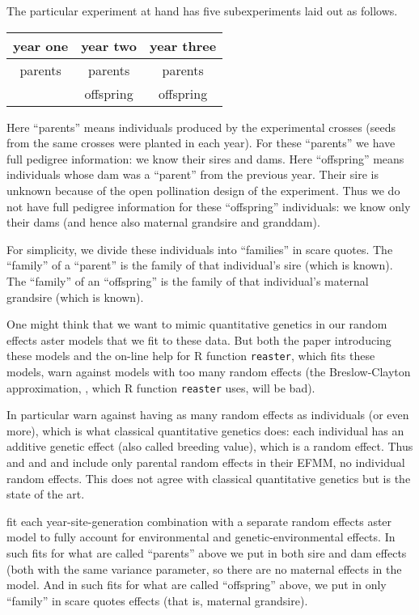 \documentclass[11pt]{article}
\let\code=\texttt
\begin{document}
The particular experiment at hand has five subexperiments laid out as follows.
\begin{center}
\begin{tabular}{ccc}
\toprule
year one & year two & year three \\
\midrule
parents & parents & parents \\
        & offspring & offspring \\
\bottomrule
\end{tabular}
\end{center}
Here ``parents'' means individuals produced by the experimental crosses
(seeds from the same crosses were planted in each year).
For these ``parents'' we have full pedigree information: we know their sires
and dams.
Here ``offspring'' means individuals whose dam was a ``parent'' from the
previous year.  Their sire is unknown because of the open pollination design
of the experiment.  Thus we do not have full pedigree information for these
``offspring'' individuals: we know only their dams (and hence also maternal
grandsire and granddam).

For simplicity, we divide these individuals into ``families'' in scare quotes.
The ``family'' of a ``parent'' is the family of that individual's sire
(which is known).
The ``family'' of an ``offspring'' is the family of that individual's
maternal grandsire (which is known).

One might think that we want to mimic quantitative genetics in our random
effects aster models that we fit to these data.  But both the paper introducing
these models \citep*[Discussion]{reaster} and the on-line help for R function
\code{reaster}, which fits these models, warn against models with too many
random effects (the Breslow-Clayton approximation, \citealp{breslow-clayton},
which R function \code{reaster} uses, will be bad).

In particular \citet{reaster} warn against having as many random effects
as individuals (or even more), which is what classical quantitative genetics
does: each individual has an additive genetic effect (also called breeding
value), which is a random effect.
Thus \citet{reaster} and \citet{kulbaba} and \citet{zenodo}
and \citet{realized} include only parental random effects in their EFMM, no
individual random effects.  This does not agree with classical quantitative
genetics but is the state of the art.

\citet*{realized} fit each year-site-generation combination with a separate
random effects
aster model to fully account for environmental and genetic-environmental
effects.  In such fits for what are called ``parents'' above we put in both
sire and dam effects (both with the same variance parameter, so there are
no maternal effects in the model.
And in such fits for what are called ``offspring'' above, we put in only
``family'' in scare quotes effects (that is, maternal grandsire).
\end{document}
